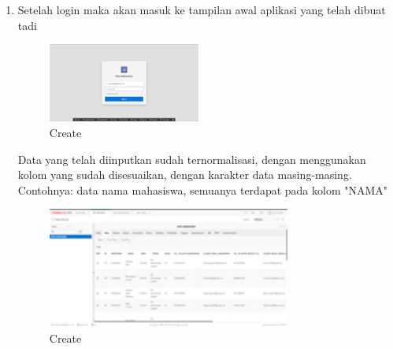 \documentclass{article}
\begin{document}
\begin{enumerate}
    \item Setelah login maka akan masuk ke tampilan awal aplikasi yang telah dibuat tadi
     \begin{figure}[h]
	\centering
	\includegraphics[width=5cm]{Figure/LRA.png}
	\caption{Create}
	\label{fig:gambar}
	\end{figure}
	
Data yang telah diinputkan sudah ternormalisasi, dengan menggunakan kolom yang sudah  disesuaikan, dengan karakter data masing-masing. Contohnya: data nama mahasiswa, semuanya terdapat pada kolom "NAMA"
     \begin{figure}[h]
	\centering
	\includegraphics[width=8cm]{Figure/Norm.png}
	\caption{Create}
	\label{fig:gambar}
	\end{figure}

	
\end{enumerate}
\end{document}

